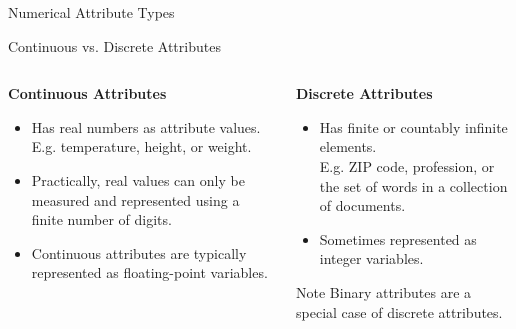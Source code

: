 \begin{frame}{Numerical Attribute Types}
\end{frame}

\begin{frame}[c]{Continuous vs. Discrete Attributes}
  \begin{columns}[t]
    \begin{column}{0.5\columnwidth}
      \centering \textbf{Continuous Attributes}
      \begin{itemize}
      \item Has real numbers as attribute values.\\
        E.g. temperature, height, or weight.
      \item Practically, real values can only be measured and represented using a finite number of digits.
      \item Continuous attributes are typically represented as floating-point variables.
      \end{itemize}
    \end{column}
    \begin{column}{0.5\columnwidth}
      \centering \textbf{Discrete Attributes}
      \begin{itemize}
      \item Has finite or countably infinite elements.\\
        E.g. ZIP code, profession, or the set of words in a collection of documents.
      \item Sometimes represented as integer variables.
      \end{itemize}
      \begin{alertblock}{Note}
        Binary attributes are a special case of discrete attributes.
      \end{alertblock}
    \end{column}
  \end{columns}
\end{frame}
